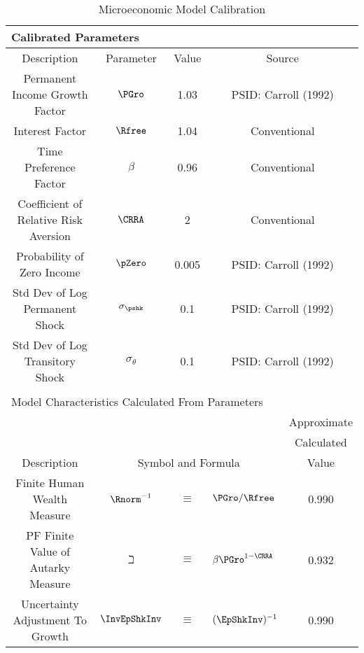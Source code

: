 \begin{table}
\begin{center}
\caption{Microeconomic Model Calibration}\label{table:Calibration}
\begin{tabular}{|c|ccl|c|}
\hline
\multicolumn{5}{|l|}{Calibrated Parameters}  \\ \hline
Description                     & \multicolumn{1}{c}{Parameter} & Value & \multicolumn{2}{c|}{Source}\\ \hline
Permanent Income Growth Factor  & \multicolumn{1}{c}{$\PGro$} & 1.03 & \multicolumn{2}{c|}{PSID: Carroll (1992)} \\
Interest Factor                 & \multicolumn{1}{c}{$\Rfree$} & 1.04 & \multicolumn{2}{c|}{Conventional} \\
Time Preference Factor          & \multicolumn{1}{c}{$\beta$} & 0.96 & \multicolumn{2}{c|}{Conventional} \\
Coefficient of Relative Risk Aversion & \multicolumn{1}{c}{$\CRRA$} & 2 & \multicolumn{2}{c|}{Conventional} \\
Probability of Zero Income      & \multicolumn{1}{c}{$\pZero$} & 0.005 & \multicolumn{2}{c|}{PSID: Carroll (1992)} \\
Std Dev of Log Permanent Shock  & \multicolumn{1}{c}{$\sigma_{\pshk}$} & 0.1 & \multicolumn{2}{c|}{PSID: Carroll (1992)} \\
Std Dev of Log Transitory Shock & \multicolumn{1}{c}{$\sigma_{\theta}$} & 0.1 & \multicolumn{2}{c|}{PSID: Carroll (1992)} \\ \hline
\multicolumn{5}{l}{}  \\ \hline
\multicolumn{5}{|l|}{Model Characteristics Calculated From Parameters}  \\ \hline
                                            & \multicolumn{3}{c|}{}                                      & Approximate \\
                                            & \multicolumn{3}{c|}{}                                       & Calculated \\
Description                                 & \multicolumn{3}{c|}{Symbol and Formula}                       & Value \\ \hline
Finite Human Wealth Measure                 & $\Rnorm^{-1}$ & $\equiv$ & $\PGro/\Rfree$                    & 0.990 \\
PF Finite Value of Autarky Measure& $\beth$ & $\equiv$ & $\beta \PGro^{1-\CRRA}$                    & 0.932 \\
Uncertainty Adjustment To Growth            & $\InvEpShkInv $ & $\equiv$ & $ (\EpShkInv)^{-1}$               & 0.990 \\

\end{tabular}
\end{center}
\end{table}
